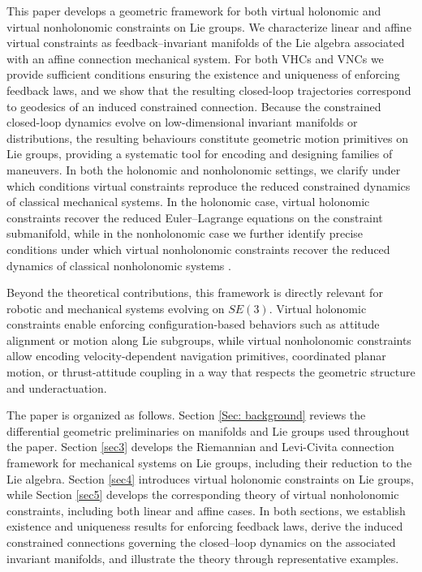 \documentclass[letterpaper, 10 pt, conference]{ieeeconf}
\begin{document}
This paper develops a geometric framework for both virtual holonomic and virtual nonholonomic constraints on Lie groups.  
We characterize linear and affine virtual constraints as feedback–invariant manifolds of the Lie algebra associated with an affine connection mechanical system.  
For both VHCs and VNCs we provide sufficient conditions ensuring the existence and uniqueness of enforcing feedback laws, and we show that the resulting closed-loop trajectories correspond to geodesics of an induced constrained connection.  
Because the constrained closed-loop dynamics evolve on low-dimensional invariant manifolds or distributions, the resulting behaviours constitute geometric motion primitives on Lie groups, providing a systematic tool for encoding and designing families of maneuvers. In both the holonomic and nonholonomic settings, we clarify under which conditions virtual constraints reproduce the reduced constrained dynamics of classical mechanical systems. In the holonomic case, virtual holonomic constraints recover the reduced Euler–Lagrange equations on the constraint submanifold, while in the nonholonomic case we further identify precise conditions under which virtual nonholonomic constraints recover the reduced dynamics of classical nonholonomic systems \cite{bloch2003nonholonomic}.

Beyond the theoretical contributions, this framework is directly relevant for robotic and mechanical systems evolving on $SE(3)$. Virtual holonomic constraints enable enforcing configuration-based behaviors such as attitude alignment or motion along Lie subgroups, while virtual nonholonomic constraints allow encoding velocity-dependent navigation primitives, coordinated planar motion, or thrust-attitude coupling in a way that respects the geometric structure and underactuation.

The paper is organized as follows. Section \ref{Sec: background} reviews the differential geometric preliminaries on manifolds and Lie groups used throughout the paper. Section \ref{sec3} develops the Riemannian and Levi-Civita connection framework for mechanical systems on Lie groups, including their reduction to the Lie algebra.
Section \ref{sec4} introduces virtual holonomic constraints on Lie groups, while Section \ref{sec5} develops the corresponding theory of virtual nonholonomic constraints, including both linear and affine cases.  
In both sections, we establish existence and uniqueness results for enforcing feedback laws, derive the induced constrained connections governing the closed--loop dynamics on the associated invariant manifolds, and illustrate the theory through representative examples.
\end{document}
